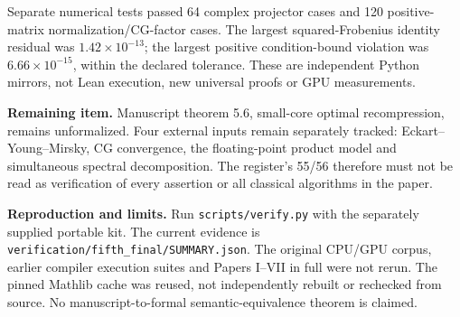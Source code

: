 \documentclass[11pt,letterpaper]{article}
\theoremstyle{definition}
\theoremstyle{remark}
\newcommand{\code}[1]{\texttt{#1}}
\begin{document}
Separate numerical tests passed 64 complex projector cases and 120 positive-matrix normalization/CG-factor cases. The largest squared-Frobenius identity residual was $1.42\times10^{-13}$; the largest positive condition-bound violation was $6.66\times10^{-15}$, within the declared tolerance. These are independent Python mirrors, not Lean execution, new universal proofs or GPU measurements.

\textbf{Remaining item.} Manuscript theorem 5.6, small-core optimal recompression, remains unformalized. Four external inputs remain separately tracked: Eckart--Young--Mirsky, CG convergence, the floating-point product model and simultaneous spectral decomposition. The register's 55/56 therefore must not be read as verification of every assertion or all classical algorithms in the paper.

\textbf{Reproduction and limits.} Run \code{scripts/verify.py} with the separately supplied portable kit. The current evidence is \code{verification/fifth\_final/SUMMARY.json}. The original CPU/GPU corpus, earlier compiler execution suites and Papers I--VII in full were not rerun. The pinned Mathlib cache was reused, not independently rebuilt or rechecked from source. No manuscript-to-formal semantic-equivalence theorem is claimed.
\end{document}
